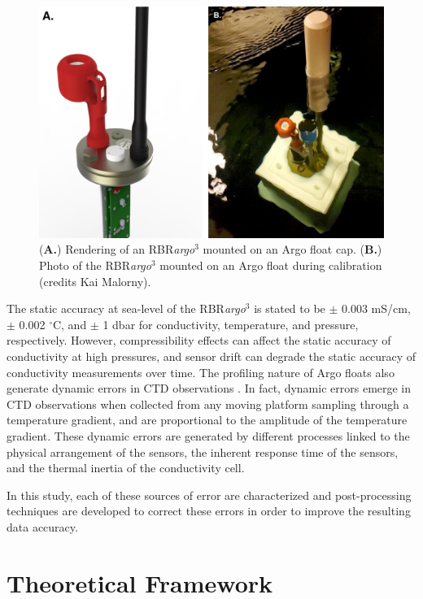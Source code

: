 \documentclass{ametsocV6.1}
\begin{document}
\begin{figure}[t]
	\centering
	\includegraphics[width = .95\linewidth]{Fig1}
	\caption{(\textbf{A.}) Rendering of an RBR\textit{argo}$^3$ mounted on an Argo float cap.  (\textbf{B.}) Photo of the RBR\textit{argo}$^3$ mounted on an Argo float during calibration (credits Kai Malorny).}
	\label{fig: RBRargo3}
\end{figure}

The static accuracy at sea-level of the RBR\textit{argo}$^3$ is stated to be $\pm$ 0.003 mS/cm, $\pm$ 0.002 $^{\circ}$C, and $\pm$ 1 dbar for conductivity, temperature, and pressure, respectively. 
However, compressibility effects can affect the static accuracy of conductivity at high pressures, and sensor drift can degrade the static accuracy of conductivity measurements over time. 
The profiling nature of Argo floats also generate dynamic errors in CTD observations \citep{Lueck_1990b, Morison_1994,Johnson_2007}. 
In fact, dynamic errors emerge in CTD observations when collected from any moving platform sampling through a temperature gradient, and are proportional to the amplitude of the temperature gradient. 
These dynamic errors are generated by different processes linked to the physical arrangement of the sensors, the inherent response time of the sensors, and the thermal inertia of the conductivity cell.

In this study, each of these sources of error are characterized and post-processing techniques are developed to correct these errors in order to improve the resulting data accuracy. 

\section{Theoretical Framework}
\label{sec: theory}
\end{document}
